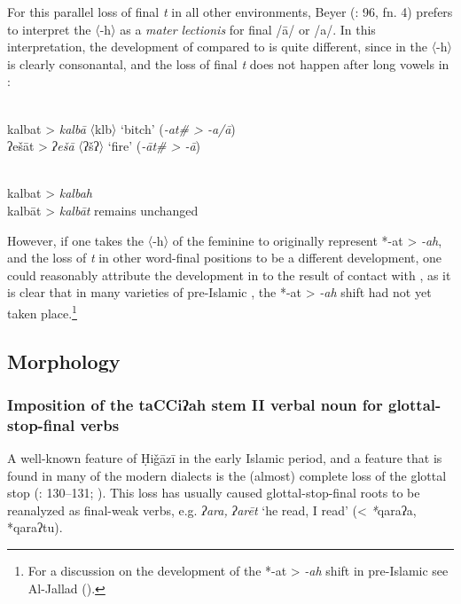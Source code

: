 \documentclass[output=paper]{langsci/langscibook}
\begin{document}
For this parallel loss of final \textit{t} in all other environments, Beyer (\citeyear{Beyer1984}: 96, fn. 4) prefers to interpret the 〈-h〉 as a \textit{mater} \textit{lectionis} for final /ā/ or /a/. In this interpretation, the development of  compared to  is quite different, since in  the 〈-h〉 is clearly consonantal, and the loss of final \textit{t} does not happen after long vowels in :


 \\
\ea *kalbat > \textit{kalbā} 〈klb〉 ‘bitch’ (\textit{-at\# > -a/ā})\\
\ex *ʔešāt > \textit{ʔešā}   〈ʔšʔ〉 ‘fire’ (\textit{-āt\# > -ā})\\
\z
\z

 \\
\ea *kalbat > \textit{kalbah}\\
\ex *kalbāt > \textit{kalbāt} remains unchanged \\
\z
\z

However, if one takes the 〈-h〉 of the feminine to originally represent *-at > \textit{-ah}, and the loss of \textit{t} in other word-final positions to be a different development, one could reasonably attribute the development in  to the result of contact with , as it is clear that in many varieties of pre-Islamic , the *-at > \textit{-ah} shift had not yet taken place.\footnote{For a discussion on the development of the *-at > \textit{-ah} shift in pre-Islamic  see Al-Jallad (\citeyear[157--158]{Al-Jallad2017Greek}).}

\subsection{\label{bkm:Ref13577493}Morphology}
\subsubsection{\label{bkm:Ref13224791}Imposition of the taCCiʔah stem II verbal noun for glottal-stop-final verbs}

A well-known feature of Ḥiǧāzī  in the early Islamic period, and a feature that is found in many of the modern dialects is the (almost) complete loss of the glottal stop (\citealt{Rabin1951}: 130--131; \citealt{vanPutten2018}). This loss has usually caused glottal-stop-final {roots} to be reanalyzed as final-weak verbs, e.g.  \textit{ʔara,} \textit{ʔarēt} ‘he read, I read’ (< \textit{*}qaraʔa, *qaraʔtu).
\end{document}
